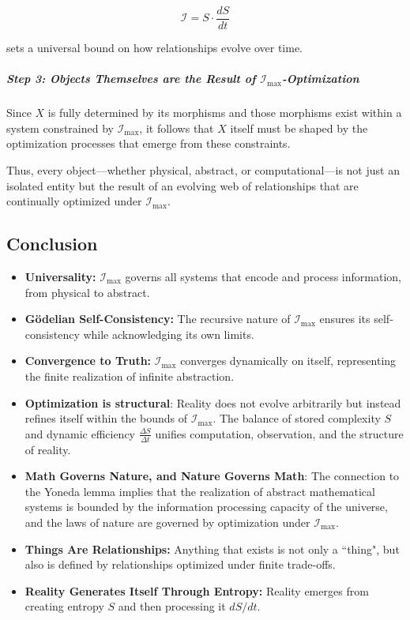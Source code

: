 \documentclass[12pt]{article}
\begin{document}
\begin{equation}
    \mathcal{I} = S \cdot \frac{dS}{dt}
\end{equation}

sets a universal bound on how relationships evolve over time. 

\subparagraph{Step 3: Objects Themselves are the Result of \(\mathcal{I}_{\max}\)-Optimization}
Since \( X \) is fully determined by its morphisms and those morphisms exist within a system constrained by \(\mathcal{I}_{\max}\), it follows that \( X \) itself must be shaped by the optimization processes that emerge from these constraints. 

Thus, every object—whether physical, abstract, or computational—is not just an isolated entity but the result of an evolving web of relationships that are continually optimized under \(\mathcal{I}_{\max}\).


\subsection{Conclusion}

\begin{itemize}
    \item \textbf{Universality:} \(\mathcal{I}_{\text{max}}\) governs all systems that encode and process information, from physical to abstract.
    \item \textbf{Gödelian Self-Consistency:} The recursive nature of \(\mathcal{I}_{\text{max}}\) ensures its self-consistency while acknowledging its own limits.
    \item \textbf{Convergence to Truth:} \(\mathcal{I}_{\text{max}}\) converges dynamically on itself, representing the finite realization of infinite abstraction.
    \item \textbf{Optimization is structural}: Reality does not evolve arbitrarily but instead refines itself within the bounds of \(\mathcal{I}_{\max}\). The balance of stored complexity \(S\) and dynamic efficiency \(\frac{\Delta S}{\Delta t}\) unifies computation, observation, and the structure of reality.
    \item \textbf{Math Governs Nature, and Nature Governs Math}: The connection to the Yoneda lemma implies that the realization of abstract mathematical systems is bounded by the information processing capacity of the universe, and the laws of nature are governed by optimization under \(\mathcal{I}_{\text{max}}\).
    \item \textbf{Things Are Relationships:} Anything that exists is not only a ``thing", but also is defined by relationships optimized under finite trade-offs.
    \item \textbf{Reality Generates Itself Through Entropy:} Reality emerges from creating entropy $S$ and then processing it $dS/dt$.
\end{itemize}
\end{document}
